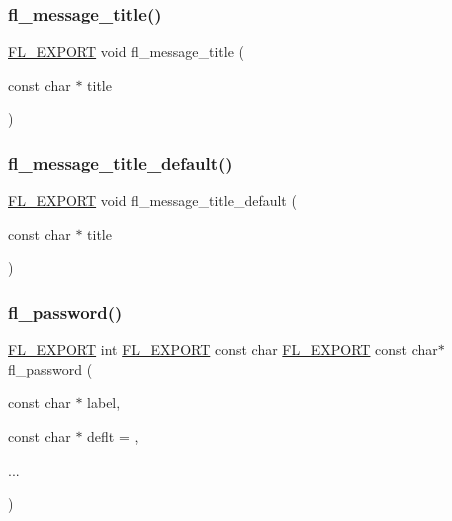 \mbox{\label{fl__ask_8_h_a0be75f2113fddabfb1da43959089f244}} 
\subsubsection{\texorpdfstring{fl\+\_\+message\+\_\+title()}{fl\_message\_title()}}
{\footnotesize\ttfamily \hyperlink{_fl___export_8_h_aa9ba29a18aee9d738370a06eeb4470fc}{F\+L\+\_\+\+E\+X\+P\+O\+RT} void fl\+\_\+message\+\_\+title (\begin{DoxyParamCaption}\item[{const char $\ast$}]{title }\end{DoxyParamCaption})}

\mbox{\label{fl__ask_8_h_aa042d79d682f16a7bb82d8834ae2f363}} 
\subsubsection{\texorpdfstring{fl\+\_\+message\+\_\+title\+\_\+default()}{fl\_message\_title\_default()}}
{\footnotesize\ttfamily \hyperlink{_fl___export_8_h_aa9ba29a18aee9d738370a06eeb4470fc}{F\+L\+\_\+\+E\+X\+P\+O\+RT} void fl\+\_\+message\+\_\+title\+\_\+default (\begin{DoxyParamCaption}\item[{const char $\ast$}]{title }\end{DoxyParamCaption})}

\mbox{\label{fl__ask_8_h_af4d1a40c51a11542958ccec0f6807a81}} 
\subsubsection{\texorpdfstring{fl\+\_\+password()}{fl\_password()}}
{\footnotesize\ttfamily \hyperlink{_fl___export_8_h_aa9ba29a18aee9d738370a06eeb4470fc}{F\+L\+\_\+\+E\+X\+P\+O\+RT} int \hyperlink{_fl___export_8_h_aa9ba29a18aee9d738370a06eeb4470fc}{F\+L\+\_\+\+E\+X\+P\+O\+RT} const char \hyperlink{_fl___export_8_h_aa9ba29a18aee9d738370a06eeb4470fc}{F\+L\+\_\+\+E\+X\+P\+O\+RT} const char$\ast$ fl\+\_\+password (\begin{DoxyParamCaption}\item[{const char $\ast$}]{label,  }\item[{const char $\ast$}]{deflt = {},  }\item[{}]{... }\end{DoxyParamCaption})}



